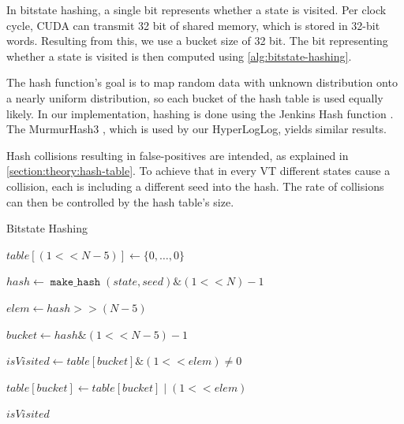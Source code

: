 \documentclass[
fancyheadings, %
%
%
]{stsreprt}
\DeclareMathOperator{\markVisited}{\texttt{mark\_visited}}
\DeclareMathOperator{\makeHash}{\texttt{make\_hash}}
\newcommand{\bitwiseAnd}{\mathbin{\text{\&}}}
\newcommand{\bitwiseOr}{\mathbin{\text{|}}}
\begin{document}
In bitstate hashing, a single bit represents whether a state is visited.
Per clock cycle, CUDA can transmit 32 bit of shared memory, which is stored in 32-bit words.
Resulting from this, we use a bucket size of 32 bit.
The bit representing whether a state is visited is then computed using \cref{alg:bitstate-hashing}.

The hash function's goal is to map random data with unknown distribution onto a nearly uniform distribution, so each bucket of the hash table is used equally likely.
In our implementation, hashing is done using the Jenkins Hash function \cite{JenkinsHash}.
The MurmurHash3 \cite{MurmurHash3}, which is used by our HyperLogLog, yields similar results.

Hash collisions resulting in false-positives are intended, as explained in \cref{section:theory:hash-table}.
To achieve that in every VT different states cause a collision, each is including a different seed into the hash.
The rate of collisions can then be controlled by the hash table's size.

\begin{algorithm}
    \caption{Bitstate Hashing}
    \label{alg:bitstate-hashing}
    \begin{algorithmic}
        \State $table[(1 << N - 5)] \gets \{0, \dots, 0\}$

        \Statex

        \Function{$\markVisited$}{table, state}
        \State $hash \gets \makeHash(state, seed) \bitwiseAnd (1 << N) - 1$

        \State $elem \gets hash >> (N - 5)$

        \State $bucket \gets hash \bitwiseAnd (1 << N - 5) - 1$

        \State $isVisited \gets table[bucket] \bitwiseAnd (1 << elem) \neq 0$

        \State $table[bucket] \gets table[bucket] \bitwiseOr (1 << elem)$

        \Statex

        \State \Return $isVisited$
        \EndFunction
    \end{algorithmic}
\end{algorithm}
\end{document}
